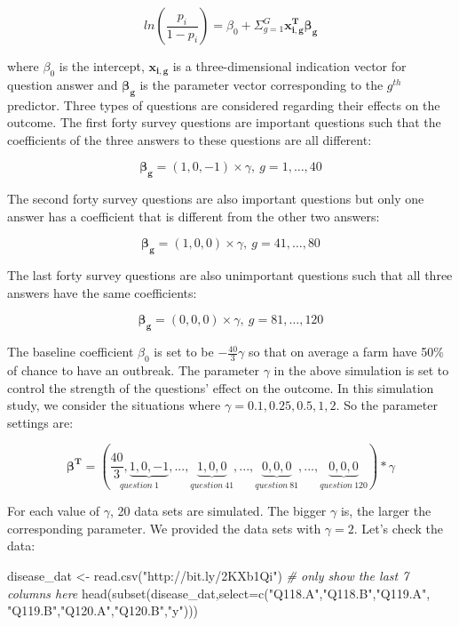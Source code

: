 \documentclass[
  12pt,
]{krantz}
\makeatletter
\newenvironment{Shaded}{\begin{snugshade}}{\end{snugshade}}
\newcommand{\AttributeTok}[1]{\textcolor[rgb]{0.61,0.61,0.61}{#1}}
\newcommand{\CommentTok}[1]{\textcolor[rgb]{0.37,0.37,0.37}{\textit{#1}}}
\newcommand{\FunctionTok}[1]{\textcolor[rgb]{0,0,0}{#1}}
\newcommand{\NormalTok}[1]{#1}
\newcommand{\OtherTok}[1]{\textcolor[rgb]{0.37,0.37,0.37}{#1}}
\newcommand{\StringTok}[1]{\textcolor[rgb]{0.5,0.5,0.5}{#1}}
\newenvironment{kframe}{%
\medskip{}
\setlength{\fboxsep}{.8em}
 \def\at@end@of@kframe{}%
 \ifinner\ifhmode%
  \def\at@end@of@kframe{\end{minipage}}%
  \begin{minipage}{\columnwidth}%
 \fi\fi%
 \def\FrameCommand##1{\hskip\@totalleftmargin \hskip-\fboxsep
 \colorbox{shadecolor}{##1}\hskip-\fboxsep
     \hskip-\linewidth \hskip-\@totalleftmargin \hskip\columnwidth}%
 \MakeFramed {\advance\hsize-\width
   \@totalleftmargin\z@ \linewidth\hsize
   \@setminipage}}%
 {\par\unskip\endMakeFramed%
 \at@end@of@kframe}
\renewenvironment{Shaded}{\begin{kframe}}{\end{kframe}}
\makeatother
\begin{document}
\[ln(\frac{p_i}{1-p_i})=\beta_0 + \Sigma_{g=1}^G\symbf{x_{i,g}^T\beta_{g}}\]

where \(\beta_0\) is the intercept, \(\mathbf{x_{i,g}}\) is a three-dimensional indication vector for question answer and \(\symbf{\beta_g}\) is the parameter vector corresponding to the \(g^{th}\) predictor. Three types of questions are considered regarding their effects on the outcome. The first forty survey questions are important questions such that the coefficients of the three answers to these
questions are all different:

\[\symbf{\beta_g}=(1,0,-1)\times \gamma,\ g=1,\dots,40\]

The second forty survey questions are also important questions but only one answer has a coefficient that is different from the other two answers:

\[\symbf{\beta_g}=(1,0,0)\times \gamma,\ g=41,\dots,80\]

The last forty survey questions are also unimportant questions such that all three answers have the same coefficients:

\[\symbf{\beta_g}=(0,0,0)\times \gamma,\ g=81,\dots,120\]

The baseline coefficient \(\beta_0\) is set to be \(-\frac{40}{3}\gamma\) so that on average a farm have 50\% of chance to have an outbreak. The parameter \(\gamma\) in the above simulation is set to control the strength of the questions' effect on the outcome. In this simulation study, we consider the situations where \(\gamma = 0.1, 0.25, 0.5, 1, 2\). So the parameter settings are:

\[\symbf{\beta^{T}} = \left(\underset{question\ 1}{\frac{40}{3},\underbrace{1,0,-1}},...,\underset{question\ 41}{\underbrace{1,0,0}},...,\underset{question\ 81}{\underbrace{0,0,0}},...,\underset{question\ 120}{\underbrace{0,0,0}}\right)*\gamma\]

For each value of \(\gamma\), 20 data sets are simulated. The bigger \(\gamma\) is, the larger the corresponding parameter. We provided the data sets with \(\gamma = 2\). Let's check the data:

\begin{Shaded}
\begin{Highlighting}[]
\NormalTok{disease\_dat }\OtherTok{\textless{}{-}} \FunctionTok{read.csv}\NormalTok{(}\StringTok{"http://bit.ly/2KXb1Qi"}\NormalTok{)}
\CommentTok{\# only show the last 7 columns here}
\FunctionTok{head}\NormalTok{(}\FunctionTok{subset}\NormalTok{(disease\_dat,}\AttributeTok{select=}\FunctionTok{c}\NormalTok{(}\StringTok{"Q118.A"}\NormalTok{,}\StringTok{"Q118.B"}\NormalTok{,}\StringTok{"Q119.A"}\NormalTok{,}
                                 \StringTok{"Q119.B"}\NormalTok{,}\StringTok{"Q120.A"}\NormalTok{,}\StringTok{"Q120.B"}\NormalTok{,}\StringTok{"y"}\NormalTok{))) }
\end{Highlighting}
\end{Shaded}
\end{document}
